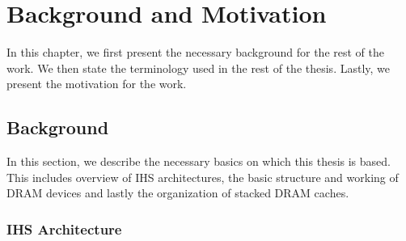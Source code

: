 \chapter{Background and Motivation} \label{chap:background}
In this chapter, we first present the necessary background for the rest of the work. We then state the terminology used in the rest of the thesis. Lastly, we present the motivation for the work.

\section{Background}
In this section, we describe the necessary basics on which this thesis is based. This includes overview of IHS architectures, the basic structure and working of DRAM devices and lastly the organization of stacked DRAM caches.
\subsection{IHS Architecture}

